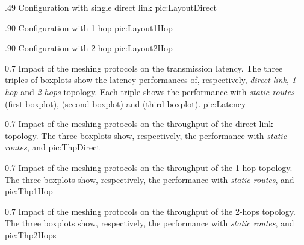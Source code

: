         {.49\columnwidth}
        {Configuration with single direct link}
        {pic:LayoutDirect}

        {.90\columnwidth}
        {Configuration with 1 hop}
        {pic:Layout1Hop}

        {.90\columnwidth}
        {Configuration with 2 hop}
        {pic:Layout2Hop}

\begin{multicols}{2}

\end{multicols}

        {0.7 \columnwidth}
        {Impact of the meshing protocols on the transmission latency. The
         three triples of boxplots show the latency performances of,
         respectively, \emph{direct link}, \emph{1-hop} and \emph{2-hops}
         topology. Each triple shows the performance with \emph{static
         routes} (first boxplot), \emph{\batman} (second boxplot) and
         \emph{\olsr} (third boxplot).}
        {pic:Latency}

        {0.7 \columnwidth}
        {Impact of the meshing protocols on the throughput of the direct
         link topology. The three boxplots show, respectively, the
         performance with \emph{static routes}, \emph{\batman} and
         \emph{\olsr}}
        {pic:ThpDirect}

        {0.7 \columnwidth}
        {Impact of the meshing protocols on the throughput of the 1-hop
         topology. The three boxplots show, respectively, the performance
         with \emph{static routes}, \emph{\batman} and \emph{\olsr}}
        {pic:Thp1Hop}

        {0.7 \columnwidth}
        {Impact of the meshing protocols on the throughput of the 2-hops
         topology. The three boxplots show, respectively, the performance
         with \emph{static routes}, \emph{\batman} and \emph{\olsr}}
        {pic:Thp2Hops}


